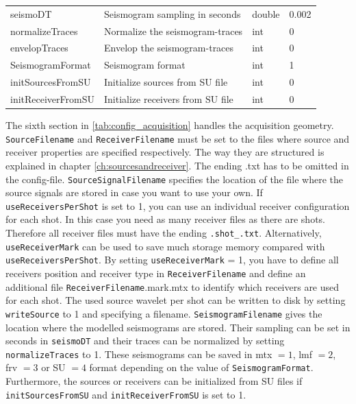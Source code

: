 \documentclass[pdftex,a4paper,parskip,listof=totoc,bibliography=totoc,onehalfspacing,12pt]{scrreprt}
\newcommand{\shellcmd}[1]{\indent\indent\texttt{#1}}	%
\begin{document}
\begin{table}[h!]
\begin{adjustbox}{width=1\textwidth,center=\textwidth}
\begin{tabular}{llll}
	seismoDT & Seismogram sampling in seconds & double & \num{0.002} \\
	normalizeTraces & Normalize the seismogram-traces & int & \num{0}\\
	envelopTraces & Envelop the seismogram-traces & int & \num{0}\\
	SeismogramFormat & Seismogram format & int & \num{1}\\
	initSourcesFromSU & Initialize sources from SU file & int & \num{0}\\
	initReceiverFromSU & Initialize receivers from SU file & int & \num{0}\\
	\bottomrule
\end{tabular}
\end{adjustbox}
\end{table}
The sixth section in \ref{tab:config_acquisition} handles the acquisition geometry. \verb+SourceFilename+ and \verb+ReceiverFilename+ must be set to the files where source and receiver properties are specified respectively. The way they are structured is explained in chapter \ref{ch:sourcesandreceiver}. The ending .txt has to be omitted in the config-file. 
\verb+SourceSignalFilename+ specifies the location of the file where the source signals are stored in case you want to use your own.
If \verb+useReceiversPerShot+ is set to 1, you can use an individual receiver configuration for each shot. In this case you need as many receiver files as there are shots. Therefore all receiver files must have the ending \shellcmd{.shot\_<shot number>.txt}. 
Alternatively, \verb+useReceiverMark+ can be used to save much storage memory compared with \verb+useReceiversPerShot+.
By setting \verb+useReceiverMark+ = 1, you have to define all receivers position and receiver type in \verb+ReceiverFilename+ and define an additional file \verb+ReceiverFilename+.mark.mtx to identify which receivers are used for each shot.
The used source wavelet per shot can be written to disk by setting \verb+writeSource+ to 1 and specifying a filename.
\verb+SeismogramFilename+ gives the location where the modelled seismograms are stored. Their sampling can be set in seconds in \verb+seismoDT+ and their traces can be normalized by setting \verb+normalizeTraces+ to 1.
These seismograms can be saved in mtx $=1$, lmf $=2$, frv $=3$ or SU $=4$ format depending on the value of \verb+SeismogramFormat+.  
Furthermore, the sources or receivers can be initialized from SU files if \verb+initSourcesFromSU+ and \verb+initReceiverFromSU+ is set to 1.
\end{document}
